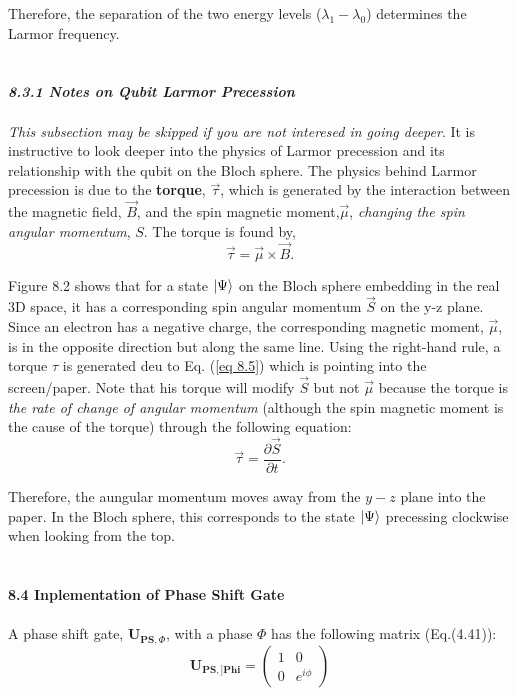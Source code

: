 \documentclass{article}
\newcommand{\bfit}[1]{\textit{\textbf{#1}}}
\begin{document}
Therefore, the separation of the two energy levels ($\lambda_1-\lambda_0$) 
determines the Larmor frequency.\\\\\\
\bfit{\large 8.3.1 Notes on Qubit Larmor Precession}\\\\
\textit{This subsection may be skipped if you are not interesed in going deeper}.
It is instructive to look deeper into the physics of Larmor precession and its relationship 
with the qubit on the Bloch sphere. The physics behind Larmor precession is due to the \textbf{torque},
$\vec{\tau}$, which is generated by the interaction between the magnetic field,
$\vec{B}$, and the spin magnetic moment,$\vec{\mu}$, \textit{changing the spin angular momentum}, $S$.
The torque is found by,
\begin{equation}\label{eq 8.15}
    \vec{\tau}=\vec{\mu}\times\vec{B}. \tag{8.15}
\end{equation}

Figure 8.2 shows that for a state $\ket{\Psi}$ on the Bloch sphere embedding in the real
3D space, it has a corresponding spin angular momentum $\vec{S}$ on the y-z plane. Since an electron
has a negative charge, the corresponding magnetic moment, $\vec{\mu}$, is in the opposite direction
but along the same line. Using the right-hand rule, a torque $\tau$ is generated deu to Eq. (\ref{eq 8.5})
which is pointing into the screen/paper. Note that his torque will modify 
$\vec{S}$ but not $\vec{\mu}$ because the torque is \textit{the rate of change of angular momentum}
(although the spin magnetic moment is the cause of the torque) through the following equation:
\begin{equation}\label{eq 8.16}
    \vec{\tau}=\frac{\partial \vec{S}}{\partial t}. \tag{8.16}
\end{equation}

Therefore, the aungular momentum moves away from the $y-z$ plane into
the paper. In the Bloch sphere, this corresponds to the state $\ket{\Psi}$
precessing clockwise when looking from the top.\\\\\\
\textbf{\large 8.4 Inplementation of Phase Shift Gate}\\\\
A phase shift gate, $\boldsymbol{U_{PS,\varPhi}}$, with a phase $\Phi$ has the following
matrix (Eq.(4.41)):
\begin{equation}\label{eq 8.17}
    \boldsymbol{U_{PS,]Phi}}=\begin{pmatrix}
        1&0\\0&e^{i\phi}
    \end{pmatrix}\tag{8.17}
\end{equation}
\end{document}
